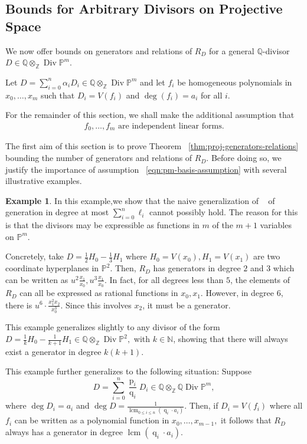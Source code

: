 \documentclass{amsart}
\theoremstyle{plain}
\theoremstyle{definition}
\newtheorem{example}[thm]{Example}
\theoremstyle{remark}
\numberwithin{equation}{subsection}
\newcommand\ssec{\subsection}
\newcommand\bn{{\mathbb N}}
\newcommand\bq{{\mathbb Q}}
\newcommand\bp{{\mathbb P}}
\newcommand\bz{{\mathbb Z}}
\DeclareMathOperator\di{Div}
\newcommand\bida{a}
\DeclareMathOperator{\num}{p}
\DeclareMathOperator{\den}{q}
\DeclareMathOperator{\lcm}{lcm}
\begin{document}
\ssec{Bounds for Arbitrary Divisors on Projective Space}
\label{ssec:arbitrary-projective}


We now offer bounds on generators and relations of $R_D$ for a general $\bq$-divisor $D \in \bq \otimes_\bz \di \bp^m$.

Let $D = \sum_{i=0}^n \alpha_i D_i \in \bq \otimes_\bz \di \bp^m$ and let $f_i$ be
homogeneous polynomials in $x_0, \ldots, x_m$ such that $D_i = V(f_i)$ and
$\deg(f_i) = a_i$ for all $i$. 

For the remainder of this section, we shall make the additional assumption that 
\begin{align} \label{eqn:pm-basis-assumption} f_0, \ldots, f_{m}
	\text{ are independent linear forms.} \end{align}

The first aim of this section is to prove Theorem
~\ref{thm:proj-generators-relations} bounding the number of generators and
relations of $R_D$. Before doing so, we justify the importance of assumption
~\eqref{eqn:pm-basis-assumption} with several illustrative examples.

\begin{example}
\label{eg:hyperplane}
In this example,we show that the naive generalization of
~\cite[Theorem 8]{dorney:canonical} of generation in degree at most
$\sum_{i=0}^{n}\ell_i$ cannot possibly hold. The reason for this is
that the divisors may be
expressible as functions in $m$ of the $m+1$ variables on $\bp^m$.

Concretely, take $D = \frac{1}{2}H_0 - \frac{1}{3}H_1$ where $H_0 = V(x_0),
H_1 = V(x_1)$ are two coordinate hyperplanes in $\bp^2$. Then, $R_D$
has generators in degree $2$ and $3$ which can be written as $u^2
\frac{x_1}{x_0}, u^3 \frac{x_1}{x_0}.$ In fact, for all degrees
less than $5$, the elements of $R_D$ can all be expressed as
rational functions in $x_0, x_1$. However, in degree $6$, there is
$u^6 \cdot \frac{x_1^2 x_2}{x_0^3}$. Since this
involves $x_2$, it must be a generator.

This example generalizes slightly to any divisor of the form $D =
\frac{1}{k}H_0 - \frac{1}{k+1}H_1 \in \bq \otimes_\bz \di \bp^2,$ with
$k \in \bn$, showing that there will always exist a generator in
degree $k(k + 1)$.

This example further generalizes to the following situation:
Suppose 
\[
	D = \sum_{i=0}^{n} \frac{\num_i}{\den_i}D_i \in \bq
	\otimes_\bz \bq \di \bp^m,
\]
where $\deg D_i = \bida_i$ and $\deg D = \frac{1}{\lcm
_{0 \leq i \leq n}(\den_i \cdot \bida_i)}$. Then, if $D_i = V(f_i)$
where all $f_i$ can be written as a polynomial function in $x_0,
\ldots, x_{m-1},$ it follows that $R_D$ always has a generator in degree
$\lcm(\den_i \cdot \bida_i)$.
\end{example}
\end{document}
